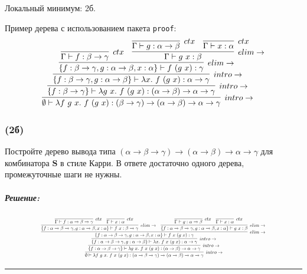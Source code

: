 \documentclass{article}
\newenvironment{proof}{\subparagraph{\hspace{-1em}Решение:\newline}}{\par\noindent\rule{\textwidth}{0.4pt}}
\newcommand{\term}[1]{\mathbf{#1}}
\begin{document}
    Локальный минимум: 2б.

    Пример дерева с использованием пакета \texttt{proof}:
    \[\resizebox{0.8\hsize}{!}{
        \infer[intro\to]
        {\emptyset \vdash \lambda f~g~x.~f~(g~x) : (\beta \to \gamma) \to (\alpha \to \beta) \to \alpha \to \gamma}
        {
            \infer[intro\to]
            {\{f: \beta \to \gamma\} \vdash \lambda g~x.~f~(g~x) : (\alpha \to \beta) \to \alpha \to \gamma}
            {
                \infer[intro\to]
                {\{f : \beta \to \gamma, g : \alpha \to \beta\} \vdash \lambda x.~f~(g~x) : \alpha \to \gamma}
                {
                    \infer[elim\to]{\{f : \beta \to \gamma, g : \alpha \to \beta, x:  \alpha\} \vdash f~(g~x) : \gamma}
                    {
                        \infer[ctx]{\Gamma \vdash f : \beta \to \gamma}{} &
                        \infer[elim\to]{\Gamma \vdash g~x : \beta}{
                            \infer[ctx]{\Gamma \vdash g : \alpha \to \beta}{} &
                            \infer[ctx]{\Gamma \vdash x : \alpha}{}
                        }
                    }
                }
            }
        }
    }\]

    \subsubsection{(2б)}

    Постройте дерево вывода типа $(\alpha \to \beta \to \gamma) \to (\alpha \to \beta) \to \alpha \to \gamma$ для комбинатора $\term{S}$ в стиле Карри.
    В ответе достаточно одного дерева, промежуточные шаги не нужны.

    \begin{proof}
        \[\resizebox{0.8\hsize}{!}{
            \infer[intro\to]
            {\emptyset \vdash \lambda f~g~x.~f~x~(g~x) : (\alpha \to \beta \to \gamma) \to (\alpha \to \beta) \to \alpha \to \gamma}
            {
                \infer[intro\to]
                {\{f: \alpha \to \beta \to \gamma\} \vdash \lambda g~x.~f~x~(g~x) : (\alpha \to \beta) \to \alpha \to \gamma}
                {
                    \infer[intro\to]
                    {\{f : \alpha \to \beta \to \gamma, g : \alpha \to \beta\} \vdash \lambda x.~f~x~(g~x) : \alpha \to \gamma}
                    {
                        \infer[elim\to]{\{f : \alpha \to \beta \to \gamma, g : \alpha \to \beta, x:  \alpha\} \vdash f~x~(g~x) : \gamma}
                        {
                            \infer[elim\to]{\{f : \alpha \to \beta \to \gamma, g : \alpha \to \beta, x: \alpha\} \vdash f~x : \beta \to \gamma}
                            {
                                \infer[ctx]{\Gamma \vdash f : \alpha \to \beta \to \gamma}{} &
                                \infer[ctx]{\Gamma \vdash x : \alpha}{}
                            } &
                            \infer[elim\to]{\{f : \alpha \to \beta \to \gamma, g : \alpha \to \beta, x: \alpha\} \vdash g~x : \beta}
                            {
                                \infer[ctx]{\Gamma \vdash g : \alpha \to \beta}{} &
                                \infer[ctx]{\Gamma \vdash x : \alpha}{}
                            }
                        }
                    }
                }
            }
        }\]
    \end{proof}
\end{document}
